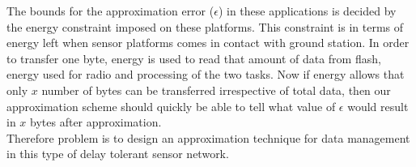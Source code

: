 \documentclass[conference]{IEEEtran}
\begin{document}
The bounds for the approximation error ($\epsilon$) in these applications is decided by the energy constraint 
imposed on these platforms. This constraint is in terms of energy left when sensor platforms comes in contact 
with ground station. In order to transfer one byte, energy is used to read that amount of data from flash, energy 
used for radio and processing of the two tasks. Now if energy allows that only $x$ number of bytes can be transferred 
irrespective of total data, then our approximation scheme should quickly be able to tell what value of $\epsilon$ 
would result in $x$ bytes after approximation.\\

Therefore problem is to design an approximation technique for data management in this type of delay tolerant sensor 
network.
\end{document}

